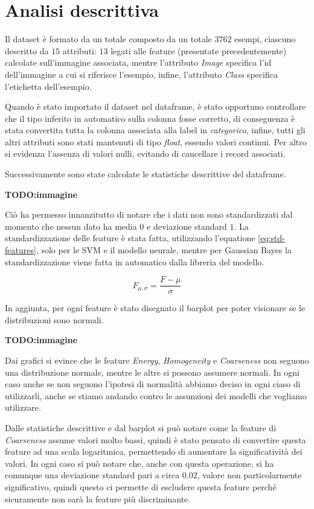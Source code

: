 \section{Analisi descrittiva}
Il dataset è formato da un totale composto da un totale $3762$ esempi, ciascuno
descritto da $15$ attributi: $13$ legati alle feature (presentate precedentemente) 
calcolate sull'immagine associata, mentre l'attributo \textit{Image} specifica l'id
dell'immagine a cui si riferisce l'esempio, infine, l'attributo \textit{Class}
specifica l'etichetta dell'esempio.

Quando è stato importato il dataset nel dataframe, è stato opportuno controllare che il tipo
inferito in automatico sulla colonna fosse corretto, di conseguenza è stata convertita
tutta la colonna associata alla label in \textit{categorico}, infine, tutti gli altri attributi sono
stati mantenuti di tipo \textit{float}, essendo valori continui. Per altro si evidenza
l'assenza di valori nulli, evitando di cancellare i record associati.

Successivamente sono state calcolate le statistiche descrittive del dataframe.

\textbf{TODO:immagine}

Ciò ha permesso innanzitutto di notare che i dati non sono standardizzati dal momento
che nessun dato ha media $0$ e deviazione standard $1$. La standardizzazione delle
feature è stata fatta, utilizzando l'equatione \ref{eq:std-features}, solo per le 
SVM e il modello neurale, mentre per Gaussian Bayes la standardizzazione viene 
fatta in automatico dalla libreria del modello.

\begin{equation}
    F_{\mu, \sigma} = \frac{F - \mu}{\sigma}
    \label{eq:std-features}
\end{equation}

In aggiunta, per ogni feature è stato disegnato il barplot per poter visionare
se le distribuzioni sono normali. 

\textbf{TODO:immagine}

Dai grafici si evince che le feature \textit{Energy}, \textit{Homogeneity} e \textit{Coarseness}
non seguono una distribuzione normale, mentre le altre si possono assumere normali.
In ogni caso anche se non seguono l'ipotesi di normalità abbiamo deciso in ogni ciaso
di utilizzarli, anche se stiamo andando contro le assunzioni dei modelli che vogliamo
utilizzare.

Dalle statistiche descrittive e dal barplot si può notare come la feature di \textit{Coarseness}
assume valori molto bassi, quindi è stato pensato di convertire questa feature ad una
scala logaritmica, permettendo di aumentare la significatività dei valori. In 
ogni caso si può notare che, anche con questa operazione, si ha comunque una deviazione standard
pari a circa $0.02$, valore non particolarmente significativo, quindi questo ci permette
di escludere questa feature perché sicuramente non sarà la feature più discriminante.

